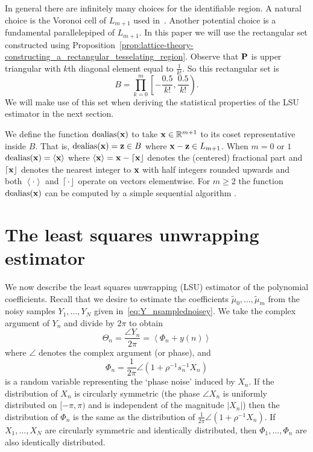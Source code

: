 \documentclass[aap]{imsart}
\newcommand{\reals}{{\mathbb R}}
\newcommand{\dealias}{\operatorname{dealias}}
\newcommand{\fracpart}[1]{\left\langle #1 \right\rangle}
\newcommand{\abs}[1]{\left\vert #1 \right\vert}
\newcommand{\round}[1]{{\left\lceil #1 \right\rfloor}}
\begin{document}
In general there are infinitely many choices for the identifiable region. A natural choice is the Voronoi cell of $L_{m+1}$ used in~\cite{McKilliam2009IndentifiabliltyAliasingPolyphase}. Another potential choice is a fundamental parallelepiped of $L_{m+1}$. In this paper we will use the rectangular set constructed using Proposition~\ref{prop:lattice-theory-constructing_a_rectangular_tesselating_region}. Observe that $\mathbf{P}$ is upper triangular with $k$th diagonal element equal to $\tfrac{1}{k!}$.  So this rectangular set is
\begin{equation}\label{eq:rectangular_identifiable_region}
B = \prod_{k=0}^{m}\left[ -\frac{0.5}{k!}, \frac{0.5}{k!}  \right).
\end{equation}
We will make use of this set when deriving the statistical properties of the LSU estimator in the next section. 

We define the function $\dealias(\xbf)$ to take $\xbf\in\reals^{m+1}$ to its coset representative inside $B$. That is, $\dealias(\xbf) = \zbf \in B$ where $\mathbf{x} - \mathbf{z} \in L_{m+1}$.  %
When $m = 0$ or $1$ $\dealias(\xbf) = \fracpart{\xbf}$ where $\fracpart{\xbf} = \xbf - \round{\xbf}$ denotes the (centered) fractional part and $\round{\xbf}$ denotes the nearest integer to $\mathbf{x}$ with half integers rounded upwards and both $\fracpart{\cdot}$ and $\round{\cdot}$ operate on vectors elementwise.  For $m \geq 2$ the function $\dealias(\xbf)$ can be computed by a simple sequential algorithm \cite[Sec. 7.2.1]{McKilliam2010thesis}.


\section{The least squares unwrapping estimator}\label{sec:least-squar-unwr}

We now describe the least squares unwrapping (LSU) estimator of the polynomial coefficients. Recall that we desire to estimate the coefficients $\tilde{\mu}_0, \dots, \tilde{\mu}_m$ from the noisy samples $Y_1, \dots, Y_N$ given in~\eqref{eq:Y_nsamplednoisey}.  We take the complex argument of $Y_n$ and divide by $2\pi$ to obtain
\begin{equation}\label{eq:noise_circ_poly}
\Theta_n = \frac{\angle{Y_n}}{2\pi} = \fracpart{ \Phi_n + y(n) }
\end{equation}
where $\angle$ denotes the complex argument (or phase), and 
\[
\Phi_n = \frac{1}{2\pi}\angle(1 + \rho^{-1}s_n^{-1}X_n)
\] 
is a random variable representing the `phase noise' induced by $X_n$.  If the distribution of $X_n$ is circularly symmetric (the phase $\angle X_n$ is uniformly distributed on $[-\pi, \pi)$ and is independent of the magnitude $\abs{X_n}$) then the distribution of $\Phi_n$ is the same as the distribution of $\tfrac{1}{2\pi}\angle(1 + \rho^{-1}X_n)$.  If $X_1, \dots, X_N$ are circularly symmetric and identically distributed, then $\Phi_1, \dots, \Phi_n$ are also identically distributed.
\end{document}
